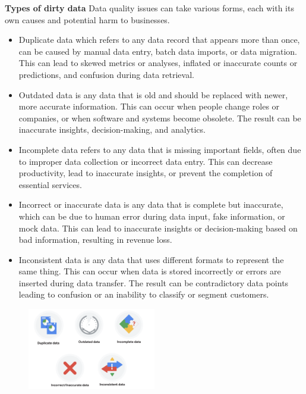 \documentclass[]{article}
\begin{document}
\textbf{Types of dirty data}
Data quality issues can take various forms, each with its own causes and potential harm to businesses.

\begin{itemize}
  \item Duplicate data which refers to any data record that appears more than once, can be caused by manual data entry, batch data imports, or data migration. This can lead to skewed metrics or analyses, inflated or inaccurate counts or predictions, and confusion during data retrieval.

  \item Outdated data is any data that is old and should be replaced with newer, more accurate information. This can occur when people change roles or companies, or when software and systems become obsolete. The result can be inaccurate insights, decision-making, and analytics.

  \item Incomplete data refers to any data that is missing important fields, often due to improper data collection or incorrect data entry. This can decrease productivity, lead to inaccurate insights, or prevent the completion of essential services.

  \item Incorrect or inaccurate data is any data that is complete but inaccurate, which can be due to human error during data input, fake information, or mock data. This can lead to inaccurate insights or decision-making based on bad information, resulting in revenue loss.

  \item Inconsistent data is any data that uses different formats to represent the same thing. This can occur when data is stored incorrectly or errors are inserted during data transfer. The result can be contradictory data points leading to confusion or an inability to classify or segment customers.
\end{itemize}

\begin{figure}[!ht]
  \centering
  \includegraphics[width=0.5\textwidth]{image/type_dirty_data.png}
\end{figure}
\end{document}
